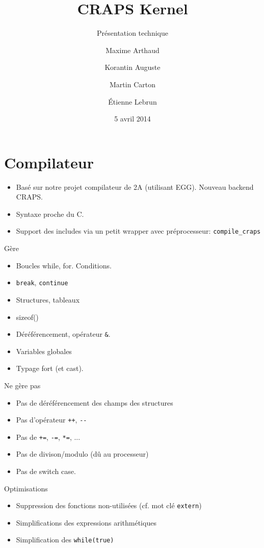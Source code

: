 \documentclass{beamer}
\title{CRAPS Kernel}
\subtitle{Présentation technique}
\author{
       Maxime Arthaud
  \and Korantin Auguste
  \and Martin Carton
  \and Étienne Lebrun
}
\date{5 avril 2014}
\begin{document}
  \begin{frame}
    \titlepage%
  \end{frame}

  \section{Compilateur}
    \begin{frame}[fragile]
      \begin{itemize}
        \item Basé sur notre projet compilateur de 2A (utilisant EGG). Nouveau
          backend CRAPS.
        \item Syntaxe proche du C.
        \item Support des includes via un petit wrapper avec préprocesseur:
          \verb+compile_craps+
      \end{itemize}
\end{frame}

    \begin{frame}[fragile]{Gère}
      \begin{itemize}
        \item Boucles while, for. Conditions.
        \item \verb+break+, \verb+continue+
        \item Structures, tableaux
        \item sizeof()
        \item Déréférencement, opérateur \verb+&+.
        \item Variables globales
        \item Typage fort (et cast).
      \end{itemize}
\end{frame}

    \begin{frame}[fragile]{Ne gère pas}
      \begin{itemize}
        \item Pas de déréférencement des champs des structures
        \item Pas d'opérateur \verb|++|, \verb|--|
        \item Pas de \verb|+=|, \verb|-=|, \verb|*=|, ...
        \item Pas de divison/modulo (dû au processeur)
        \item Pas de switch case.
      \end{itemize}
\end{frame}

    \begin{frame}[fragile]{Optimisations}
      \begin{itemize}
        \item Suppression des fonctions non-utilisées (cf. mot clé
          \verb+extern+)
        \item Simplifications des expressions arithmétiques
        \item Simplification des \verb+while(true)+
      \end{itemize}
\end{frame}
\end{document}
